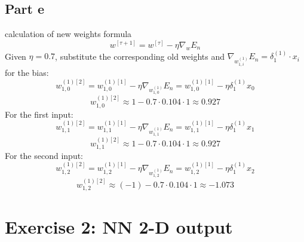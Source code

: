\documentclass[a4paper, 10pt]{article}
\begin{document}
\subsection{Part e}
calculation of new weights formula
$$
w^{[\tau+1]}=w^{[\tau]}-\eta\nabla_w E_n
$$
Given $\eta=0.7$, substitute the corresponding old weights and $\nabla_{w_{1,i}^{(1)}}E_n=\delta_1^{(1)}\cdot x_i$
for the bias:
$$
w_{1,0}^{(1)[2]}= w_{1,0}^{(1)[1]}-\eta\nabla_{w_{1,0}^{(1)}}E_n = w_{1,0}^{(1)[1]}-\eta\delta_1^{(1)}x_0
$$
$$
w_{1,0}^{(1)[2]}\approx 1-0.7\cdot0.104\cdot1 \approx0.927
$$
For the first input:
$$
w_{1,1}^{(1)[2]}= w_{1,1}^{(1)[1]}-\eta\nabla_{w_{1,1}^{(1)}}E_n = w_{1,1}^{(1)[1]}-\eta\delta_1^{(1)}x_1
$$
$$
w_{1,1}^{(1)[2]}\approx 1-0.7\cdot0.104\cdot1 \approx0.927
$$
For the second input:
$$
w_{1,2}^{(1)[2]}= w_{1,2}^{(1)[1]}-\eta\nabla_{w_{1,2}^{(1)}}E_n = w_{1,2}^{(1)[1]}-\eta\delta_1^{(1)}x_2
$$
$$
w_{1,2}^{(1)[2]}\approx (-1)-0.7\cdot0.104\cdot1 \approx -1.073
$$

\section{Exercise 2: NN 2-D output}
\end{document}
